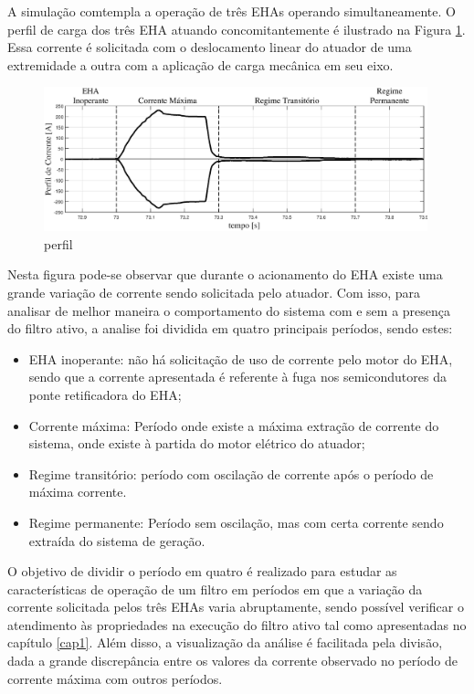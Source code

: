 A simulação comtempla a operação de três EHAs operando simultaneamente. O perfil de carga dos três EHA atuando concomitantemente é ilustrado na Figura \ref{fig:perfil.eps}. Essa corrente é solicitada com o deslocamento linear do atuador de uma extremidade a outra com a aplicação de carga mecânica em seu eixo.

\begin{figure}[!htb] %
	\centering
	\includegraphics[width=0.99\textwidth]{Cap4/Figuras/perfil.eps}
	\caption{perfil}
	\label{fig:perfil.eps}
\end{figure}

Nesta figura pode-se observar que durante o acionamento do EHA existe uma grande variação de corrente sendo solicitada pelo atuador. Com isso, para analisar de melhor maneira o comportamento do sistema com e sem a presença do filtro ativo, a analise foi dividida em quatro principais períodos, sendo estes:

\begin{itemize}
	\item EHA inoperante: não há solicitação de uso de corrente pelo motor do EHA, sendo que a corrente apresentada é referente à fuga nos semicondutores da ponte retificadora do EHA;
	\item Corrente máxima: Período onde existe a máxima extração de corrente do sistema, onde existe à partida do motor elétrico do atuador;
	\item Regime transitório: período com oscilação de corrente após o período de máxima corrente.
	\item Regime permanente: Período sem oscilação, mas com certa corrente sendo extraída do sistema de geração.
\end{itemize}

O objetivo de dividir o período em quatro é realizado para estudar as características de operação de um filtro em períodos em que a variação da corrente solicitada pelos três EHAs varia abruptamente, sendo possível verificar o atendimento às propriedades na execução do filtro ativo tal como apresentadas no capítulo \ref{cap1}. Além disso, a visualização da análise é facilitada pela divisão, dada a grande discrepância entre os valores da corrente observado no período de corrente máxima com outros períodos.

